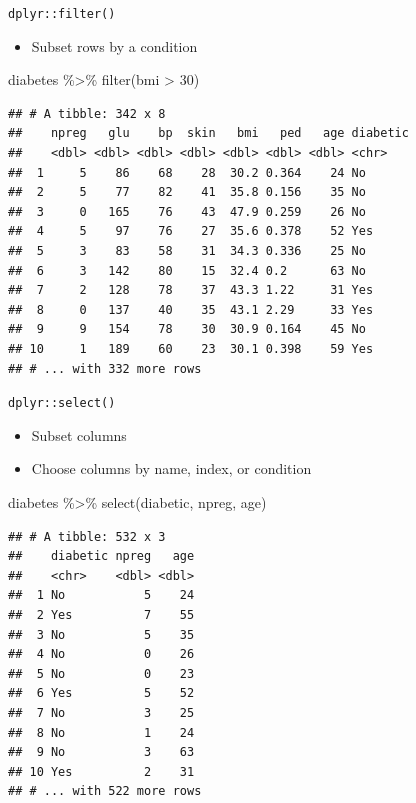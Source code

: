 \documentclass[
  ignorenonframetext,
]{beamer}
\newenvironment{Shaded}{\begin{snugshade}}{\end{snugshade}}
\newcommand{\DecValTok}[1]{\textcolor[rgb]{0.00,0.00,0.81}{#1}}
\newcommand{\FunctionTok}[1]{\textcolor[rgb]{0.00,0.00,0.00}{#1}}
\newcommand{\NormalTok}[1]{#1}
\newcommand{\SpecialCharTok}[1]{\textcolor[rgb]{0.00,0.00,0.00}{#1}}
\providecommand{\tightlist}{%
  \setlength{\itemsep}{0pt}\setlength{\parskip}{0pt}}
\begin{document}
\begin{frame}[fragile]{\texttt{dplyr::filter()}}
\protect\hypertarget{dplyrfilter-1}{}
\begin{itemize}
\tightlist
\item
  Subset rows by a condition
\end{itemize}

\begin{Shaded}
\begin{Highlighting}[]
\NormalTok{diabetes }\SpecialCharTok{\%\textgreater{}\%} 
  \FunctionTok{filter}\NormalTok{(bmi }\SpecialCharTok{\textgreater{}} \DecValTok{30}\NormalTok{)}
\end{Highlighting}
\end{Shaded}

\begin{verbatim}
## # A tibble: 342 x 8
##    npreg   glu    bp  skin   bmi   ped   age diabetic
##    <dbl> <dbl> <dbl> <dbl> <dbl> <dbl> <dbl> <chr>   
##  1     5    86    68    28  30.2 0.364    24 No      
##  2     5    77    82    41  35.8 0.156    35 No      
##  3     0   165    76    43  47.9 0.259    26 No      
##  4     5    97    76    27  35.6 0.378    52 Yes     
##  5     3    83    58    31  34.3 0.336    25 No      
##  6     3   142    80    15  32.4 0.2      63 No      
##  7     2   128    78    37  43.3 1.22     31 Yes     
##  8     0   137    40    35  43.1 2.29     33 Yes     
##  9     9   154    78    30  30.9 0.164    45 No      
## 10     1   189    60    23  30.1 0.398    59 Yes     
## # ... with 332 more rows
\end{verbatim}
\end{frame}

\begin{frame}[fragile]{\texttt{dplyr::select()}}
\protect\hypertarget{dplyrselect}{}
\begin{itemize}
\tightlist
\item
  Subset columns
\item
  Choose columns by name, index, or condition
\end{itemize}

\begin{Shaded}
\begin{Highlighting}[]
\NormalTok{diabetes }\SpecialCharTok{\%\textgreater{}\%} 
  \FunctionTok{select}\NormalTok{(diabetic, npreg, age)}
\end{Highlighting}
\end{Shaded}

\begin{verbatim}
## # A tibble: 532 x 3
##    diabetic npreg   age
##    <chr>    <dbl> <dbl>
##  1 No           5    24
##  2 Yes          7    55
##  3 No           5    35
##  4 No           0    26
##  5 No           0    23
##  6 Yes          5    52
##  7 No           3    25
##  8 No           1    24
##  9 No           3    63
## 10 Yes          2    31
## # ... with 522 more rows
\end{verbatim}
\end{frame}
\end{document}
